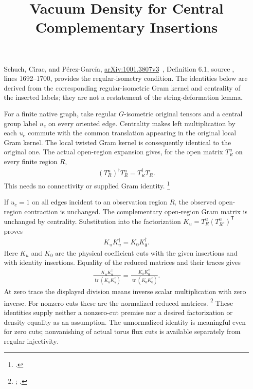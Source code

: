 \documentclass{article}
\title{Vacuum Density for Central Complementary Insertions}
\author{}
\date{}
\begin{document}
\maketitle
{}

Schuch, Cirac, and P\'erez-Garc\'ia,
\href{https://arxiv.org/abs/1001.3807v3}{arXiv:1001.3807v3}~\cite{Schuch2010PEPS},
Definition 6.1, source
, lines 1692--1700,
provides the regular-isometry condition. The identities below are derived
from the corresponding regular-isometric Gram kernel and centrality of the
inserted labels; they are not a restatement of the string-deformation lemma.

For a finite native graph, take regular $G$-isometric original tensors
and a central group label $u_e$ on every oriented edge. Centrality makes
left multiplication by each $u_e$ commute with the common translation
appearing in the original local Gram kernel. The local twisted Gram
kernel is consequently identical to the original one. The actual
open-region expansion gives, for the open matrix $T_R^u$ on every finite region $R$,
\begin{align}
    (T_R^u)^\dagger T_R^u=T_R^\dagger T_R.
    \label{eq:scp10_central_flux_open_gram}
\end{align}
This needs no connectivity or supplied Gram identity.
\footnote{.}

If $u_e=1$ on all edges incident to an observation region $R$, the
observed open-region contraction is unchanged. The complementary
open-region Gram matrix is unchanged by centrality. Substitution into
the factorization $K_u=T_R^u(T_{R^c}^u)^{\mathsf T}$ proves
\begin{align}
    K_uK_u^\dagger=K_0K_0^\dagger.
    \label{eq:scp10_central_flux_reduced}
\end{align}
Here $K_u$ and $K_0$ are the physical coefficient cuts with the given insertions
and with identity insertions. Equality of the reduced matrices and their traces gives
\begin{align}
    \frac{K_uK_u^\dagger}{\operatorname{tr}(K_uK_u^\dagger)}
    =\frac{K_0K_0^\dagger}{\operatorname{tr}(K_0K_0^\dagger)}.
    \label{eq:scp10_central_flux_normalized}
\end{align}
At zero trace the displayed division means inverse scalar multiplication
with zero inverse. For nonzero cuts these are the normalized reduced matrices.
\footnote{;
.}
These identities supply neither a nonzero-cut premise nor a desired
factorization or density equality as an assumption. The unnormalized
identity is meaningful even for zero cuts; nonvanishing of actual torus
flux cuts is available separately from regular injectivity.
\end{document}
